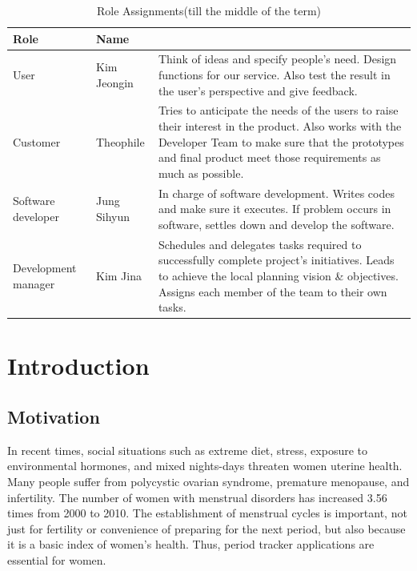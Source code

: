 \documentclass[conference]{IEEEtran}
\begin{document}
\begin{table}[ht!] \renewcommand\arraystretch{1.25}
  \begin{threeparttable}
      \caption{Role Assignments(till the middle of the term)%
      \label{tab:table1}}    %
      \begin{tabular}{@{}l l>{\raggedright\arraybackslash}p{3.8cm}@{}}
      \toprule
      \bfseries Role & \bfseries Name & \multicolumn{1}{l}{\bfseries Task description and etc.} \\
      \midrule
      User & Kim Jeongin & Think of ideas and specify people's need. Design functions for our service. Also test the result in the user's perspective and give feedback. \\
      Customer & Theophile & Tries to anticipate the needs of the users to raise their interest in the product. Also works with the Developer Team to make sure that the prototypes and final product meet those requirements as much as possible. \\
      Software developer & Jung Sihyun & In charge of software development. Writes codes and make sure it executes. If problem occurs in software, settles down and develop the software. \\
      Development manager & Kim Jina & Schedules and delegates tasks required to successfully complete project's initiatives. Leads to achieve the local planning vision \& objectives. Assigns each member of the team to their own tasks. \\
      \bottomrule
      \end{tabular}
  \end{threeparttable}
\end{table}

\section{Introduction}
\subsection{Motivation}
In recent times, social situations such as extreme diet, stress, exposure to environmental hormones, and mixed nights-days threaten women uterine health. Many people suffer from polycystic ovarian syndrome, premature menopause, and infertility. The number of women with menstrual disorders has increased 3.56 times from 2000 to 2010\cite{b1}. The establishment of menstrual cycles is important, not just for fertility or convenience of preparing for the next period, but also because it is a basic index of women's health. Thus, period tracker applications are essential for women. 
\end{document}
